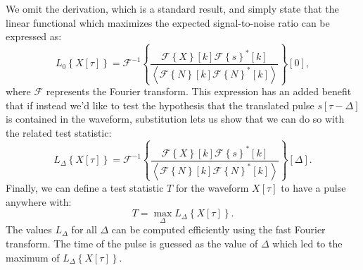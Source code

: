 We omit the derivation, which is a standard result, and simply state that the linear functional which maximizes the expected signal-to-noise ratio can be expressed as:~\cite{MatchedFilterPaper}
\begin{equation}
L_0\left\{X[\tau]\right\} = \mathcal{F}^{-1}\left\{ \frac{\mathcal{F}\left\{X\right\}[k] \mathcal{F}\left\{s\right\}^{*}[k]}{\left<\mathcal{F}\left\{N\right\}[k]\mathcal{F}\left\{N\right\}^{*}[k]\right>}\right\}[0],
\end{equation}
where $\mathcal{F}$ represents the Fourier transform.  This expression has an added benefit that if instead we'd like to test the hypothesis that the translated pulse $s[\tau - \Delta]$ is contained in the waveform, substitution lets us show that we can do so with the related test statistic:
\begin{equation}
L_\Delta\left\{X[\tau]\right\} = \mathcal{F}^{-1}\left\{ \frac{\mathcal{F}\left\{X\right\}[k] \mathcal{F}\left\{s\right\}^{*}[k]}{\left<\mathcal{F}\left\{N\right\}[k]\mathcal{F}\left\{N\right\}^{*}[k]\right>}\right\}[\Delta].
\end{equation}
Finally, we can define a test statistic $T$ for the waveform $X[\tau]$ to have a pulse anywhere with:
\begin{equation}
T = \max_{\Delta} L_\Delta\left\{X[\tau]\right\}.
\end{equation}
The values $L_\Delta$ for all $\Delta$ can be computed efficiently using the fast Fourier transform.  The time of the pulse is guessed as the value of $\Delta$ which led to the maximum of $L_\Delta\left\{X[\tau]\right\}$.

